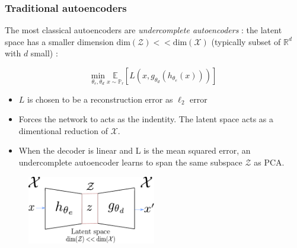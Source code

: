 \documentclass[french,9pt]{beamer}
\begin{document}
\begin{frame}
\frametitle{Traditional autoencoders}

The most classical autoencoders are \emph{undercomplete autoencoders} : the latent space has a smaller dimension $\text{dim}(\mathcal{Z}) << \text{dim}(\mathcal{X})$ (typically subset of $\mathbb{R}^{d}$ with $d$ small) : 


\begin{equation}
\label{autoencoderclassical}
\underset{\theta_{e},\theta_{d}}{\text{min}} \ \underset{x \sim \mathbb{P}_{r}}{\mathbb{E}}[L(x,g_{\theta_{d}}(h_{\theta_{e}}(x)))]
\end{equation}

\begin{itemize}
\item $L$ is chosen to be a reconstruction error as $\ell_{2}$ error
\item Forces the network to acts as the indentity. The latent space acts as a dimentional reduction of $\mathcal{X}$.
\item When the decoder is linear and L is the mean squared error, an undercomplete autoencoder learns to span the same subspace $\mathcal{Z}$ as PCA.
\end{itemize}


\begin{figure}
\label{autoencodeurfig}
\centering
    \includegraphics[width=0.5\textwidth]{fig/autoencoder.pdf}
\end{figure}

\end{frame}

\end{document}
